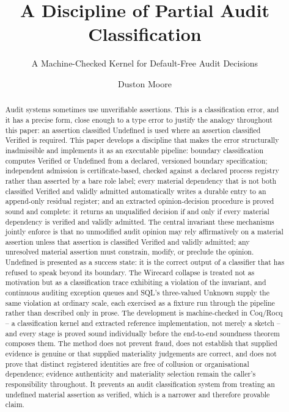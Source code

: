 \documentclass[smallcondensed,envcountsect,natbib]{svjour3}
\title{A Discipline of Partial Audit Classification}
\subtitle{A Machine-Checked Kernel for Default-Free Audit Decisions}
\author{Duston Moore}
\institute{D.~Moore \at
Independent Researcher, Edmonton, Alberta, Canada \\
\email{dhwcmoore@gmail.com}}
\newcommand{\state}[1]{\textsf{#1}}
\begin{document}
\maketitle

\begin{abstract}
Audit systems sometimes use unverifiable assertions. This is a classification error, and it has a precise form, close enough to a type error to justify the analogy throughout this paper: an assertion classified \state{Undefined} is used where an assertion classified \state{Verified} is required. This paper develops a discipline that makes the error structurally inadmissible and implements it as an executable pipeline: boundary classification computes \state{Verified} or \state{Undefined} from a declared, versioned boundary specification; independent admission is certificate-based, checked against a declared process registry rather than asserted by a bare role label; every material dependency that is not both classified \state{Verified} and validly admitted automatically writes a durable entry to an append-only residual register; and an extracted opinion-decision procedure is proved sound and complete: it returns an unqualified decision if and only if every material dependency is verified and validly admitted. The central invariant these mechanisms jointly enforce is that no unmodified audit opinion may rely affirmatively on a material assertion unless that assertion is classified Verified and validly admitted; any unresolved material assertion must constrain, modify, or preclude the opinion. \state{Undefined} is presented as a success state: it is the correct output of a classifier that has refused to speak beyond its boundary. The Wirecard collapse is treated not as motivation but as a classification trace exhibiting a violation of the invariant, and continuous auditing exception queues and SQL's three-valued \state{Unknown} supply the same violation at ordinary scale, each exercised as a fixture run through the pipeline rather than described only in prose. The development is machine-checked in Coq/Rocq -- a classification kernel and extracted reference implementation, not merely a sketch -- and every stage is proved sound individually before the end-to-end soundness theorem composes them. The method does not prevent fraud, does not establish that supplied evidence is genuine or that supplied materiality judgements are correct, and does not prove that distinct registered identities are free of collusion or organisational dependence; evidence authenticity and materiality selection remain the caller's responsibility throughout. It prevents an audit classification system from treating an undefined material assertion as verified, which is a narrower and therefore provable claim.
\end{abstract}
\end{document}
